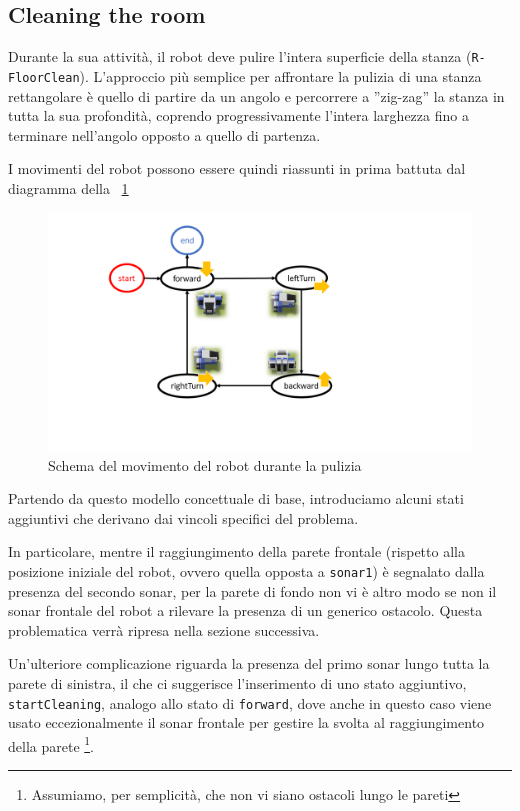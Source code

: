 \documentclass{../llncs}
\newcommand{\code}[1]{{\color{blue}\small{\texttt{#1}}}}
\newcommand{\labelfig}[1]{\label{fig:#1}}
\newcommand{\xf}[1]{\figurename~\ref{fig:#1}}
\begin{document}
\subsection{Cleaning the room}
Durante la sua attività, il robot deve pulire l'intera superficie della stanza (\code{R-FloorClean}). L'approccio più semplice per affrontare la pulizia di una stanza rettangolare è quello di partire da un angolo e percorrere a ''zig-zag'' la stanza in tutta la sua profondità, coprendo progressivamente l'intera larghezza fino a terminare nell'angolo opposto a quello di partenza.

I movimenti del robot possono essere quindi riassunti in prima battuta dal diagramma della \xf{floorCleanDraft}

\begin{figure}[!htb]
\centering
\includegraphics[scale=0.45]{img/stateDiagramCleaningDraft.png}
\caption{Schema del movimento del robot durante la pulizia}\labelfig{floorCleanDraft}
\end{figure}

Partendo da questo modello concettuale di base, introduciamo alcuni stati aggiuntivi che derivano dai vincoli specifici del problema.

In particolare, mentre il raggiungimento della parete frontale (rispetto alla posizione iniziale del robot, ovvero quella opposta a \code{sonar1}) è segnalato dalla presenza del secondo sonar, per la parete di fondo non vi è altro modo se non il sonar frontale del robot a rilevare la presenza di un generico ostacolo. Questa problematica verrà ripresa nella sezione successiva.

Un'ulteriore complicazione riguarda la presenza del primo sonar lungo tutta la parete di sinistra, il che ci suggerisce l'inserimento di uno stato aggiuntivo, \texttt{startCleaning}, analogo allo stato di \texttt{forward}, dove anche in questo caso viene usato eccezionalmente il sonar frontale per gestire la svolta al raggiungimento della parete
\footnote{Assumiamo, per semplicità, che non vi siano ostacoli lungo le pareti}.
\end{document}
